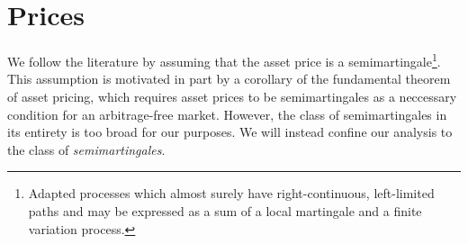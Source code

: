 
\section{Prices} \label{sec:model}
We follow the literature by assuming that the asset price is a semimartingale\footnote{Adapted processes which almost surely have  right-continuous, left-limited paths and  may be expressed as a sum of a local martingale and a finite variation process.}. This assumption is motivated in part by a corollary of  the fundamental theorem of asset pricing, which requires asset prices to be semimartingales as a neccessary   condition for an arbitrage-free market. However, the class of semimartingales in its entirety  is  too broad for our purposes. We will instead confine our analysis to the class of   \emph{\ito  semimartingales}.


\begin{comment}Let $(\Omega, \mcal{F}, \{\mcal{F}_t\}_{t \ge 0}, \p)$ be a filtered probability space satifying the \emph{usual conditions}. We consider prices\footnote{Our use of the term \emph{prices}  is not intended to restrict the  discussion  to untransformed prices. $X$ could  represent log-transformed prices or asset returns. The only requirement is that the data being analyzed   satisfies \eqref{eq:semimartingale} and $\sigma^2$ is of interest to the analyst.}    
 that evolve over time according to:
\begin{align}
  X_t & = X_0 + \int_0^t b(s) \D s + \int_0^t \sigma(s) \D W_s   + J_t, \qquad t \in [0,1]  
  \label{eq:semimartingale}
\end{align}
where $J$ is a pure jump \levy  process; \sbm is a standard Brownian motion;  $X_0$ is a constant;   $b$ and $\sigma$  are both progressively measurable  processes. We follow the ususal practice of referring to either $\sigma$ or $\sigma^2$  as \emph{(spot) volatility}, with \emph{(spot) variance} reserved exclusively for $\sigma^2$ when it is important to make a  distinction between the two. In addition, to stress the connection with the arithmetic Brownian motion with drift case, $b$ and $\sigma$ will occasionally be referred to, respectively, as the \emph{drift coefficient} and the \emph{diffusion coefficient}. 
 The class of continuous \ito processes is large; it contains for example   solutions of all stochastic differential equations.
 \end{comment}

